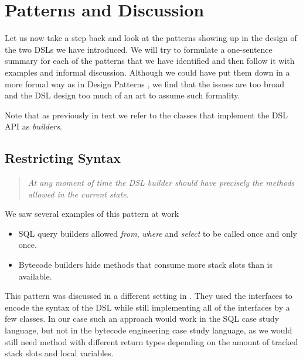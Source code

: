 \documentclass{sig-alternate}
\begin{document}
\section{Patterns and Discussion}

Let us now take a step back and look at the patterns showing up in the design of the two DSLs we have introduced. We will try to formulate a one-sentence summary for each of the patterns that we have identified and then follow it with examples and informal discussion. Although we could have put them down in a more formal way as in Design Patterns \cite{gamma1995dpe}, we find that the issues are too broad and the DSL design too much of an art to assume such formality.

Note that as previously in text we refer to the classes that implement the DSL API as \emph{builders}. 

\subsection{Restricting Syntax}

\begin{quote}
\emph{At any moment of time the DSL builder should have precisely the methods allowed in the current state.}
\end{quote}

We saw several examples of this pattern at work
\begin{itemize}
\item SQL query builders allowed \emph{from}, \emph{where} and \emph{select} to be called once and only once.
\item Bytecode builders hide methods that consume more stack slots than is available.
\end{itemize}

This pattern was discussed in a different setting in \cite{freeman2004jsr}. They used the interfaces to encode the syntax of the DSL while still implementing all of the interfaces by a few classes. In our case such an approach would work in the SQL case study language, but not in the bytecode engineering case study language, as we would still need method with different return types depending on the amount of tracked stack slots and local variables. 
\end{document}
